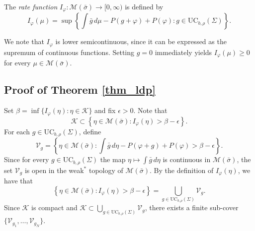 \documentclass[letterpaper,11pt]{amsart}
\numberwithin{equation}{section}     %
\newcommand{\K}{\mathcal{K}}
\newcommand{\M}{\mathcal{M}}
\def\phi{\varphi}
\def\M{{\mathcal M}}
\def\ge{\geqslant}
\def\M{\mathcal{M}}
\begin{document}
\begin{definition}
The \emph{rate function} $I_\phi:\M(\bar\sigma) \to [0,\infty)$ is defined by
\begin{equation*}
I_\phi(\mu)= \sup \left\{ \int \bar{g}\, d \mu -P(g+\phi)  +P(\phi) : g \in \text{UC}_{b,\rho}(\Sigma)	\right\}.
\end{equation*}
\end{definition}

We note that $I_\phi$ is lower semicontinuous, since it can be expressed as the supremum of continuous functions. 
Setting $g=0$ immediately yields $I_\phi(\mu) \ge 0$ for every $\mu \in \M(\bar\sigma)$.



\subsection{Proof of Theorem \ref{thm_ldp}}

Set $\beta=\inf\{I_\phi(\eta):\eta\in \mathcal{K}\}$ and fix $\epsilon >0$. Note that
\begin{equation*}
\K \subset \left\{	 \eta \in \M(\bar\sigma): I_\phi(\eta) > \beta - \epsilon	 \right\}.
\end{equation*}
For each $g\in \text{UC}_{b,\rho}(\Sigma)$, define 
$$\mathcal{V}_g= \left\{	 \eta \in \M(\bar\sigma): \int \bar{g} \, d \eta - P(\phi+g) + P(\phi) > \beta - \epsilon	\right\}.$$  Since for every  $g\in \text{UC}_{b,\rho}(\Sigma)$ the map $\eta \mapsto  \int \bar{g}\, d \eta$ is continuous in $\M(\bar\sigma)$,  the set $\mathcal{V}_g$ is open in the weak$^\ast$ topology of $\M(\bar{\sigma})$. By the definition of $I_\phi(\eta)$,  we have that
$$\left\{	 \eta \in \M(\bar\sigma): I_\phi(\eta) > \beta - \epsilon	 \right\} =  \bigcup_{g \in \text{UC}_{b,\rho}(\Sigma)}\mathcal{V}_g.$$
Since $\K$ is compact and $\mathcal{K}\subset  \bigcup_{g \in \text{UC}_{b,\rho}(\Sigma)}\mathcal{V}_g$, there exists a finite sub-cover $\{\mathcal{V}_{g_1}, \dots , \mathcal{V}_{g_N}\}$. 
\end{document}

